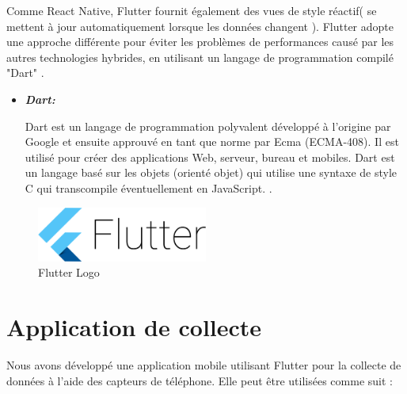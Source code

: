 Comme React Native\cite{ReactNativeFramework}, Flutter fournit également des vues de style réactif( se mettent à jour automatiquement lorsque les données changent ). Flutter adopte une approche différente pour éviter les problèmes de performances causé par les autres technologies hybrides, en utilisant un langage de programmation compilé "Dart" \cite{rahmouniBindex}.
\renewcommand{\labelitemi}{$\bullet$}
\begin{itemize}
    \item \textbf{\textit{Dart:}}

          Dart est un langage de programmation polyvalent développé à l’origine par Google et ensuite approuvé en tant que norme par Ecma (ECMA-408). Il est utilisé pour créer des applications Web, serveur, bureau et mobiles.
          Dart est un langage basé sur les objets (orienté objet) qui utilise une syntaxe de style C qui transcompile éventuellement en JavaScript. \cite{WhatRevolutionaryFlutter}.
\end{itemize}
\begin{figure}[h!]
    \center
    \includegraphics[width=0.50\textwidth]{Images/chapter3/flutter.png}
    \caption{Flutter Logo}
    \label{fig:Technologies}
\end{figure}





\section{Application de collecte}
\label{sec:app_record}
Nous avons développé une application mobile utilisant Flutter pour la collecte de données à l'aide des capteurs de téléphone. Elle peut être utilisées comme suit :

